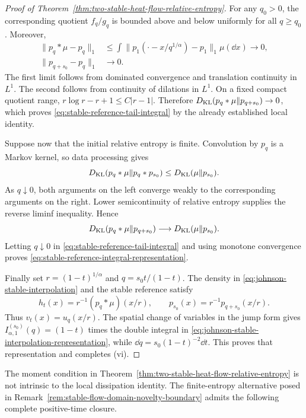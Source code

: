 \begin{proof}[Proof of Theorem~\ref{thm:two-stable-heat-flow-relative-entropy}]
For any \(q_0>0\), the corresponding quotient \(f_q/g_q\) is bounded above
and below uniformly for all \(q\ge q_0\).  Moreover,
\begin{align*}
 \|p_q*\mu-p_q\|_1
 &\le\int\|p_1(\mathord\cdot-x/q^{1/\alpha})-p_1\|_1\mu(\dd x)
 \longrightarrow0,\\
 \|p_{q+s_0}-p_q\|_1&\longrightarrow0.
\end{align*}
The first limit follows from dominated convergence and translation
continuity in \(L^1\).  The second follows from continuity of dilations in
\(L^1\).  On a fixed compact quotient range,
\(r\log r-r+1\le C|r-1|\).  Therefore
\(D_{\rm KL}(p_q*\mu\|p_{q+s_0})\to0\), which proves
\eqref{eq:stable-reference-tail-integral} by the already established local
identity.

Suppose now that the initial relative entropy is finite.  Convolution by
\(p_q\) is a Markov kernel, so data processing gives
\[
 D_{\rm KL}(p_q*\mu\|p_q*p_{s_0})
 \le D_{\rm KL}(\mu\|p_{s_0}).
\]
As \(q\downarrow0\), both arguments on the left converge weakly to the
corresponding arguments on the right.  Lower semicontinuity of relative
entropy supplies the reverse liminf inequality.  Hence
\begin{equation}\label{eq:stable-reference-small-time-kl-limit}
 D_{\rm KL}(p_q*\mu\|p_{q+s_0})
 \longrightarrow D_{\rm KL}(\mu\|p_{s_0}).
\end{equation}
Letting \(q\downarrow0\) in
\eqref{eq:stable-reference-tail-integral} and using monotone convergence
proves \eqref{eq:stable-reference-integral-representation}.

Finally set \(r=(1-t)^{1/\alpha}\) and
\(q=s_0t/(1-t)\).  The density in
\eqref{eq:johnson-stable-interpolation} and the stable reference satisfy
\[
 h_t(x)=r^{-1}(p_q*\mu)(x/r),\qquad
 p_{s_0}(x)=r^{-1}p_{q+s_0}(x/r).
\]
Thus \(v_t(x)=u_q(x/r)\).  The spatial change of variables in the jump form
gives \(I_{\alpha,1}^{(s_0)}(q)=(1-t)\) times the double integral in
\eqref{eq:johnson-stable-interpolation-representation}, while
\(\dd q=s_0(1-t)^{-2}\dd t\).  This proves that representation and
completes \textup{(vi)}.
\end{proof}

The moment condition in Theorem~\ref{thm:two-stable-heat-flow-relative-entropy}
is not intrinsic to the local dissipation identity.  The finite-entropy
alternative posed in Remark~\ref{rem:stable-flow-domain-novelty-boundary}
admits the following complete positive-time closure.

